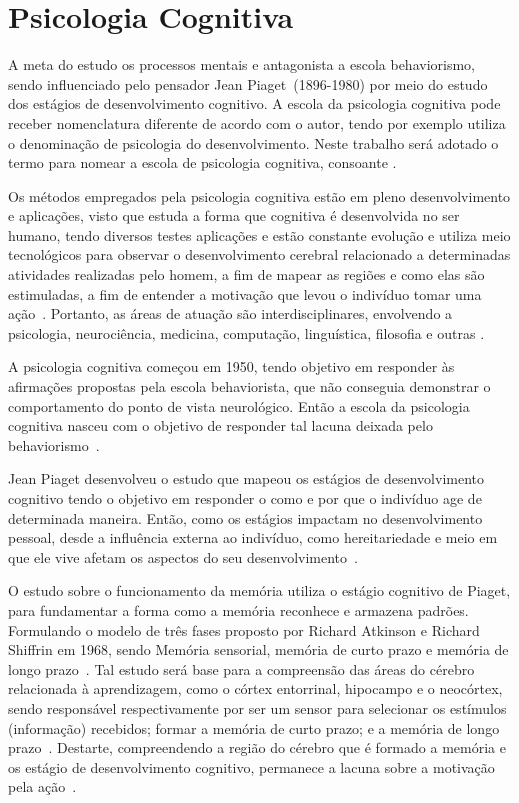 \section{Psicologia Cognitiva}\label{cognitivismo}

A meta do estudo os processos mentais e antagonista a escola behaviorismo, sendo influenciado pelo pensador Jean Piaget~(1896-1980) por meio do estudo dos estágios de desenvolvimento cognitivo. 
A escola da psicologia cognitiva pode receber nomenclatura diferente de acordo com o autor, tendo por exemplo   utiliza o denominação de psicologia do desenvolvimento. 
Neste trabalho será adotado o termo para nomear a escola de psicologia cognitiva, consoante .

Os métodos empregados pela psicologia cognitiva estão em pleno desenvolvimento e aplicações, visto que estuda a forma que cognitiva é desenvolvida no ser humano, tendo diversos testes aplicações e estão constante evolução e utiliza meio tecnológicos para observar o desenvolvimento cerebral relacionado a determinadas atividades realizadas pelo homem, a fim de mapear as regiões e como elas são estimuladas, a fim de entender a motivação que levou o indivíduo tomar uma ação~\cite{nicolelis2015cerebro}. 
Portanto, as áreas de atuação são interdisciplinares, envolvendo a psicologia, neurociência, medicina, computação, linguística, filosofia e outras \cite{eysenck2017psi_cognitiva}.

A psicologia cognitiva começou em 1950, tendo objetivo em responder às afirmações propostas pela escola behaviorista, que não conseguia demonstrar o comportamento do ponto de vista neurológico.
Então a escola da psicologia cognitiva nasceu com o objetivo de responder tal lacuna deixada pelo behaviorismo~\cite{sternberg2000psicologia, laruse2009geral}.

Jean Piaget desenvolveu o estudo que mapeou os estágios de desenvolvimento cognitivo tendo o objetivo em responder o como e por que o indivíduo age de determinada maneira.
Então, como os estágios impactam no desenvolvimento pessoal, desde a influência externa ao indivíduo, como hereitariedade e meio em que ele vive afetam os aspectos do seu desenvolvimento~\cite{bock1999psicologias}. 

O estudo sobre o funcionamento da memória utiliza o estágio cognitivo de Piaget, para fundamentar a forma como a memória reconhece e armazena padrões.
Formulando o modelo de três fases proposto por Richard Atkinson e Richard Shiffrin em 1968, sendo Memória sensorial, memória de curto prazo e memória de longo prazo~\cite{laruse2009geral}.
Tal estudo será base para a compreensão das áreas do cérebro relacionada à aprendizagem, como o córtex entorrinal, hipocampo e o neocórtex, sendo responsável respectivamente por ser um sensor para selecionar os estímulos (informação) recebidos; formar a memória de curto prazo; e a memória de longo prazo~\cite{carey2014aprendemos}.
Destarte, compreendendo a região do cérebro que é formado a memória e os estágio de desenvolvimento cognitivo, permanece a lacuna sobre a motivação pela ação~\cite{sternberg2000psicologia}.

